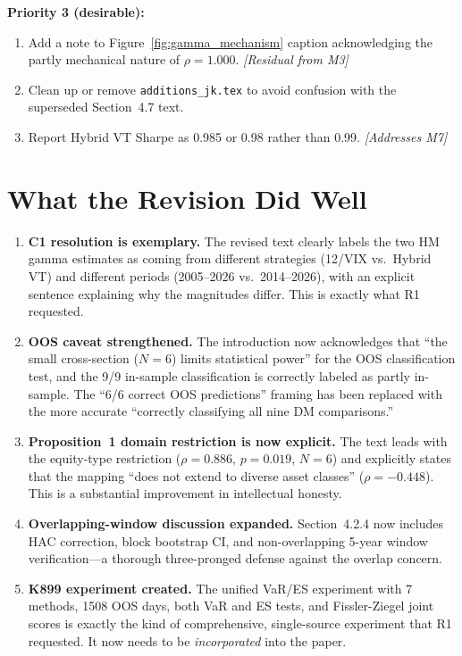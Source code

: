 \documentclass[12pt,a4paper]{article}
\begin{document}
\textbf{Priority 3 (desirable):}
\begin{enumerate}[resume]
\item Add a note to Figure~\ref{fig:gamma_mechanism} caption acknowledging the partly mechanical nature of $\rho = 1.000$. \textit{[Residual from M3]}

\item Clean up or remove \texttt{additions\_jk.tex} to avoid confusion with the superseded Section~4.7 text.

\item Report Hybrid VT Sharpe as 0.985 or 0.98 rather than 0.99. \textit{[Addresses M7]}
\end{enumerate}


\bigskip

\section*{What the Revision Did Well}

\begin{enumerate}
\item \textbf{C1 resolution is exemplary.} The revised text clearly labels the two HM gamma estimates as coming from different strategies (12/VIX vs.\ Hybrid VT) and different periods (2005--2026 vs.\ 2014--2026), with an explicit sentence explaining why the magnitudes differ. This is exactly what R1 requested.

\item \textbf{OOS caveat strengthened.} The introduction now acknowledges that ``the small cross-section ($N = 6$) limits statistical power'' for the OOS classification test, and the 9/9 in-sample classification is correctly labeled as partly in-sample. The ``6/6 correct OOS predictions'' framing has been replaced with the more accurate ``correctly classifying all nine DM comparisons.''

\item \textbf{Proposition~1 domain restriction is now explicit.} The text leads with the equity-type restriction ($\rho = 0.886$, $p = 0.019$, $N = 6$) and explicitly states that the mapping ``does not extend to diverse asset classes'' ($\rho = -0.448$). This is a substantial improvement in intellectual honesty.

\item \textbf{Overlapping-window discussion expanded.} Section~4.2.4 now includes HAC correction, block bootstrap CI, and non-overlapping 5-year window verification---a thorough three-pronged defense against the overlap concern.

\item \textbf{K899 experiment created.} The unified VaR/ES experiment with 7 methods, 1508 OOS days, both VaR and ES tests, and Fissler-Ziegel joint scores is exactly the kind of comprehensive, single-source experiment that R1 requested. It now needs to be \textit{incorporated} into the paper.
\end{enumerate}
\end{document}
